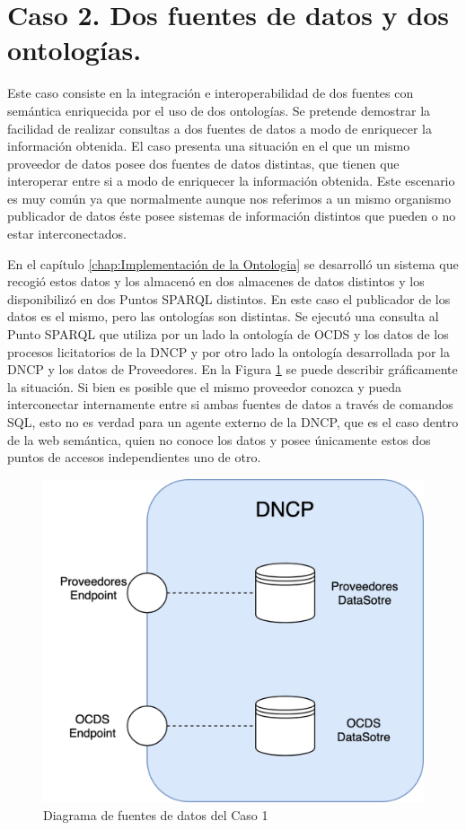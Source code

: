 \section{Caso 2. Dos fuentes de datos y dos ontologías.}
\label{section:caso2}

Este caso consiste en la integración e interoperabilidad de dos fuentes con semántica enriquecida por el uso de dos ontologías. Se pretende demostrar la facilidad de realizar consultas a dos fuentes de datos a modo de enriquecer la información obtenida. El caso presenta una situación en el que un mismo proveedor de datos posee dos fuentes de datos distintas, que tienen que interoperar entre si a modo de enriquecer la información obtenida. Este escenario es muy común ya que normalmente aunque nos referimos a un mismo organismo publicador de datos éste posee sistemas de información distintos que pueden o no estar interconectados.


En el capítulo \ref{chap:Implementación de la Ontologia} se desarrolló un sistema que recogió estos datos y los almacenó en dos almacenes de datos distintos y los disponibilizó en dos Puntos SPARQL distintos. En este caso el publicador de los datos es el mismo, pero las ontologías son distintas. Se ejecutó una consulta al Punto SPARQL que utiliza por un lado la ontología de OCDS y los datos de los procesos licitatorios de la DNCP y por otro lado la ontología desarrollada por la DNCP y los datos de Proveedores. En la Figura \ref{img:Diagramacaso2Endpoint} se puede describir gráficamente la situación. Si bien es posible que el mismo proveedor conozca y pueda interconectar internamente entre si ambas fuentes de datos a través de comandos SQL, esto no es verdad para un agente externo de la DNCP, que es el caso dentro de la web semántica, quien no conoce los datos y posee únicamente estos dos puntos de accesos independientes uno de otro.

 \begin{figure}[ht!]
    \centering
    \includegraphics[width=150mm]{figuras/Diagramas-Caso2-Ilustracion.png}
    \caption{Diagrama de fuentes de datos del Caso 1}
    \label{img:Diagramacaso2Endpoint}
 \end{figure}


